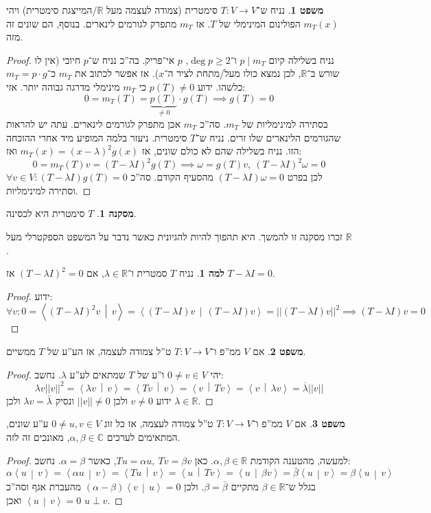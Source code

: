 \documentclass[a4paper]{article}
\newcommand\R     {\mathbb{R}}
\newcommand\C     {\mathbb{C}}
\newcommand\ra    {\rangle}
\newcommand\la    {\langle}
\newcommand\ol    {\overline}
\newcommand\co        {\colon}
\newcommand\norm[1]   {\left \vert \left \vert #1 \right \vert \right \vert}
\newcommand\mut [2]   {\left \la #1 \,\middle\vert\, #2 \right \ra}
\newcommand\ag        {\alpha}
\newcommand\bg        {\beta}
\renewcommand\lg      {\lambda}
\theoremstyle{definition}
\newtheorem{Theorem}{\color{myblue}משפט}
\newtheorem{Lemma}{\color{myyellow}למה}
\newtheorem{Collary}{\color{mymagenta}מסקנה}
\newcommand\cola [1] {\begin{Collary}#1\end{Collary}}
\newcommand\theo  [1] {\begin{Theorem}#1\end{Theorem}}
\newcommand\lem   [1] {\begin{Lemma}#1\end{Lemma}}
\begin{document}
	\theo{נניח ש־$T \co V \to V$ סימטרית (צמודה לעצמה מעל $\R$/המייצגת סימטרית) ויהי $m_T(x)$ הפולינום המינימלי של $T$. אז $m_T$ מתפרק לגורמים לינארים. בנוסף, הם שונים זה מזה. }
	\begin{proof}
		נניח בשלילה קיום $p \mid m_T$ ו־$\deg p \ge 2$, $p $ אי־פריק. בה''כ נניח ש־$p$ חיובי (אין לו שורש ב־$\R$, לכן נמצא כולו מעל/מתחת לציר ה־$x$). אז אפשר לכתוב את $m_T$ כ־$m_T = p \cdot g$ כלשהו. ידוע $p(T) \neq 0$ כי $m_T$ מינימלי מדרגה גבוהה יותר. 
		אזי: 
		\[ 0 = m_T(T) = \underbrace{p(T)}_{\neq 0} \cdot g(T) \implies g(T) = 0 \]
		בסתירה למינימליות של $m_T$. סה''כ $m_T$ אכן מתפרק לגורמים לינארים. עתה יש להראות שהגורמים הלינארים שלו זרים. נניח ש־$T$ סימטרית. ניעזר בלמה המופיע מיד אחרי ההוכחה הזו. נניח בשלילה שהם לא כולם שונים, אז $m_T(x) = (x - \lg)^2g(x)$ ואז: 
		\[ 0 = m_T(T)v = (T - \lg I)^{2}g(T) \implies \omega = g(T)v, \ (T - \lg I)^2\omega = 0 \]
		לכן בפרט $(T - \lg I)\omega = 0$ מהסעיף הקודם. סה''כ $\forall v \in V \co (T - \lg I)g(T) = 0$ וסתירה למינימליות. 
	\end{proof}
	
	\cola{$T$ סימטרית היא לכסינה. }
	זכרו מסקנה זו להמשך. היא תהפוך להיות להגיונית כאשר נדבר על המשפט הספקטרלי מעל $\R$. 
	
	\lem{נניח $T$ סמטרית ו־$\lg \in \R$, אם $(T - \lg I)^{2} = 0$ אז $T - \lg I = 0$. }\begin{proof}
		ידוע: 
		\[ \forall v \co 0 = \mut{(T - \lg I)^{2}v}{v} = \mut{(T - \lg I)v}{(T - \lg I)v} = \norm{(T - \lg I)v}^2 \implies (T - \lg I)v = 0 \]
	\end{proof}
	
	\theo{אם $V$ ממ''פ ו־$T \co V \to V$ ט''ל צמודה לעצמה, אז הע''ע של $T$ ממשיים. }\begin{proof}
		יהי $0 \neq v \in V$ ו''ע של $T$ שמתאים לע''ע $\lg$. נחשב: 
		\[ \lg v\norm{v}^2 = \mut{\lg v}{v} = \mut{T v}{v} = \mut{v}{Tv} = \mut{v}{\lg v} = \ol \lg \norm{v} \]
		ידוע $v \neq 0$ ולכן $\norm{v} \neq 0$ ונסיק $\lg v = \bar \lg $ ולכן $\lg \in \R$. 
	\end{proof}
	
	\theo{אם $V$ ממ''פ ו־$T \co V \to V$ ט''ל צמודה לעצמה, אז כל זוג $0 \neq u, v \in V$ ע''ע שונים, המתאימים לערכים $\ag, \bg \in \C$, מאונכים זה לזה. }\begin{proof}
		למעשה, מהטענה הקודמת $\ag, \bg \in \R$. כאן $Tu = \ag u, \ Tv = \bg v$, כאשר $\ag = \bg$. נחשב: 
		\[ \ag \mut{u}{v} = \mut{\ag u}{v} = \mut{Tu}{v} = \mut{u}{Tv} = \mut{u}{\bg v} = \bar \bg \mut{u}{v} = \bg \mut{u}{v} \]
		בגלל ש־$\bg \in \R$ מתקיים $\bg = \bar \bg$. ולכן $(\ag - \bg)\mut{v}{u} = 0$ מהעברת אגף וסה''כ $\mut{u}{v} = 0$ ואכן $u \perp v$. 
	\end{proof}
	
\end{document}
